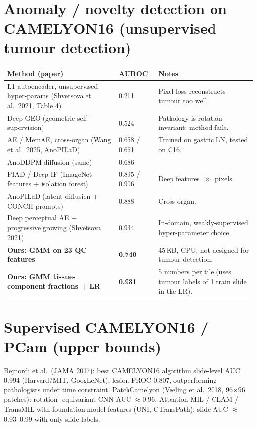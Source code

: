 \section{Anomaly / novelty detection on CAMELYON16 (unsupervised tumour detection)}
\begin{longtable}{p{5.2cm}p{3cm}p{7.6cm}}\toprule
\textbf{Method (paper)} & \textbf{AUROC} & \textbf{Notes}\\\midrule
L1 autoencoder, unsupervised hyper-params (Shvetsova et al.\ 2021, Table 4) & 0.211 & Pixel loss reconstructs tumour too well.\\
Deep GEO (geometric self-supervision) & 0.524 & Pathology is rotation-invariant: method fails.\\
AE / MemAE, cross-organ (Wang et al.\ 2025, AnoPILaD) & 0.658 / 0.661 & Trained on gastric LN, tested on C16.\\
AnoDDPM diffusion (same) & 0.686 & \\
PIAD / Deep-IF (ImageNet features + isolation forest) & 0.895 / 0.906 & Deep features $\gg$ pixels.\\
AnoPILaD (latent diffusion + CONCH prompts) & 0.888 & Cross-organ.\\
Deep perceptual AE + progressive growing (Shvetsova 2021) & 0.934 & In-domain, weakly-supervised hyper-parameter choice.\\
\textbf{Ours: GMM on 23 QC features} & \textbf{0.740} & 45\,KB, CPU, not designed for tumour detection.\\
\textbf{Ours: GMM tissue-component fractions + LR} & \textbf{0.931} & 5 numbers per tile (uses tumour labels of 1 train slide in the LR).\\
\bottomrule\end{longtable}

\section{Supervised CAMELYON16 / PCam (upper bounds)}
Bejnordi et al.\ (JAMA 2017): best CAMELYON16 algorithm slide-level AUC 0.994 (Harvard/MIT, GoogLeNet), lesion FROC 0.807,
outperforming pathologists under time constraint. PatchCamelyon (Veeling et al.\ 2018, 96$\times$96 patches): rotation-
equivariant CNN AUC $\approx$0.96. Attention MIL / CLAM / TransMIL with foundation-model features (UNI, CTransPath):
slide AUC $\approx$0.93--0.99 with only slide labels.

